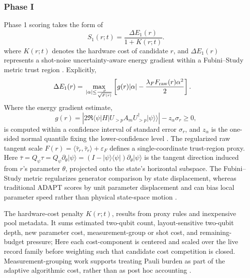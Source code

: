 \documentclass[
  reprint,
  amsmath,
  amssymb,
  aps,
  pra,
  nofootinbib,
  superscriptaddress,
  floatfix
]{revtex4-2}
\newcommand{\eps}{\varepsilon}
\newcommand{\ket}[1]{|#1\rangle}
\begin{document}
\subsubsection{Phase I}
Phase 1 scoring takes the form of
\begin{equation}
S_1(r;t)=\frac{\Delta E_{1}(r)}{1+K(r;t)}.
\label{eq:phase1_score}
\end{equation}
where $K(r;t)$ denotes the hardware cost of candidate $r$, and $\Delta E_{1}(r)$ represents a shot-noise uncertainty-aware energy gradient within a Fubini--Study metric trust region \cite{Nocedal2006TrustRegion}. Explicitly,
\begin{equation}
\begin{split}
\Delta E_{1}(r)={}&\max_{|\alpha|\le \frac{\rho}{\sqrt{F(r)}}} \left[g(r)|\alpha|-\frac{\lambda_FF_{\rm raw}(r)\alpha^2}{2}\right].
\end{split}
\label{eq:phase1_gain}
\end{equation}
Where the energy gradient estimate,
\begin{equation}
g(r)=\left|2\Re\langle\psi|H|U_{>p}A_mU_{>p}^{\dagger}\ket{\psi}\rangle\right|-z_{\alpha}\sigma_r \geq0,
\label{eq:lcb_gradient}
\end{equation}
is computed within a confidence interval of standard error $\sigma_r$, and $z_{\alpha}$ is the one-sided normal quantile fixing the lower-confidence level \cite{Ikhtiarudin2025ShotEfficient}. The regularized raw tangent scale $F(r)=\langle\bar\tau_r,\bar\tau_r\rangle+\eps_F$ defines a single-coordinate trust-region proxy. Here $\bar \tau = Q_\psi\tau= Q_\psi\partial_\theta |\psi\rangle=(I-|\psi\rangle \langle \psi |) \partial_\theta |\psi \rangle$ is the tangent direction induced from $r$'s parameter $\theta$, projected onto the state's horizontal subspace. The Fubini--Study metric regularizes generator comparison by state displacement, whereas traditional ADAPT scores by unit parameter displacement and can bias local parameter speed rather than physical state-space motion \cite{ProvostVallee1980,Stokes2020QNG}.

The hardware-cost penalty $K(r;t)$, results from proxy rules and inexpensive pool metadata. It sums estimated two-qubit count, layout-sensitive two-qubit depth, new parameter cost, measurement-group or shot cost, and remaining-budget pressure; Here each cost-component is centered and scaled over the live record family before weighting such that candidate cost competition is closed. Measurement-grouping work supports treating Pauli burden as part of the adaptive algorithmic cost, rather than as post hoc accounting \cite{Verteletskyi2020CliqueCover,Yen2020CompatibleMeasurements}.
\end{document}
